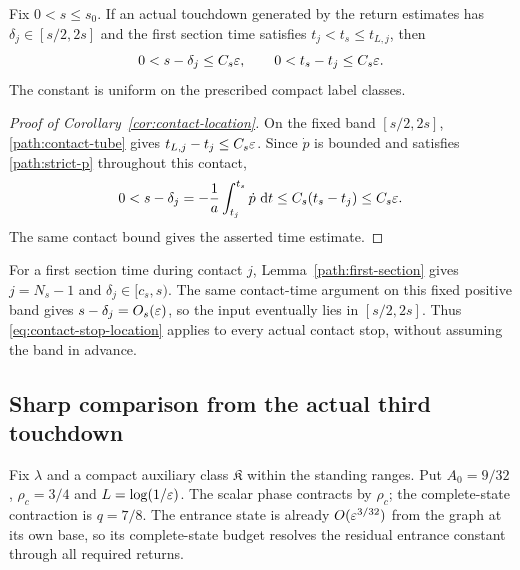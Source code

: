 \begin{corollary}
\label{cor:contact-location}
Fix $0<s\le s_0$. If an actual touchdown generated by the return estimates has
$\delta_j\in[s/2,2s]$ and the first section time satisfies
$t_j<t_s\le t_{L,j}$, then
\begin{equation}
 0<s-\delta_j\le C_s\varepsilon,\qquad
 0<t_s-t_j\le C_s\varepsilon.
 \label{eq:contact-stop-location}
\end{equation}
The constant is uniform on the prescribed compact label classes.
\end{corollary}

\begin{proof}[Proof of Corollary~\ref{cor:contact-location}]
On the fixed band $[s/2,2s]$, \eqref{path:contact-tube} gives
$t_{L,j}-t_j\le C_s\varepsilon$. Since $\dot p$ is bounded and satisfies
\eqref{path:strict-p} throughout this contact,
\[
 0<s-\delta_j=-\frac1a\int_{t_j}^{t_s}\dot p\,\,\mathrm d t
       \le C_s(t_s-t_j)\le C_s\varepsilon.
\]
The same contact bound gives the asserted time estimate.
\end{proof}


For a first section time during contact $j$, Lemma~\ref{path:first-section}
gives $j=N_s-1$ and $\delta_j\in[c_s,s)$. The same contact-time
argument on this fixed positive band gives $s-\delta_j=O_s(\varepsilon)$,
so the input eventually lies in $[s/2,2s]$.
Thus \eqref{eq:contact-stop-location} applies to every actual contact stop,
without assuming the band in advance.

\subsection{Sharp comparison from the actual third touchdown}

Fix $\lambda$ and a compact auxiliary class $\mathfrak K$ within
the standing ranges. Put $A_0=9/32$, $\rho_c=3/4$ and
$L=\log(1/\varepsilon)$. The scalar phase contracts by $\rho_c$;
the complete-state contraction is $q=7/8$.
The entrance state is already $O(\varepsilon^{3/32})$ from the graph at
its own base, so its complete-state budget resolves the residual
entrance constant through all required returns.

